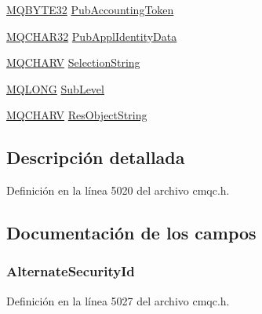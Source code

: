\begin{DoxyCompactItemize}
\item 
\hyperlink{cmqc_8h_aaa021c16e95b8aaab0a28fa5c3756d9d}{M\+Q\+B\+Y\+T\+E32} \hyperlink{structtag_m_q_s_d_af93c638cce691abfce1562bb498b1c38}{Pub\+Accounting\+Token}
\item 
\hyperlink{cmqc_8h_a0b7dd696f0148465fe80f6eae57b38a2}{M\+Q\+C\+H\+A\+R32} \hyperlink{structtag_m_q_s_d_aeae4d639ab8ac667cc227e3c6463cc74}{Pub\+Appl\+Identity\+Data}
\item 
\hyperlink{cmqc_8h_a2a61029e155515c1360dfc809dab6747}{M\+Q\+C\+H\+A\+R\+V} \hyperlink{structtag_m_q_s_d_ab3a91014a229bd897c17cbd04563bca2}{Selection\+String}
\item 
\hyperlink{cmqc_8h_a1fb8d28cbda3fa8766a9821230cdb6d5}{M\+Q\+L\+O\+N\+G} \hyperlink{structtag_m_q_s_d_a380ddfc450dd5ceb714a3d818f82c79b}{Sub\+Level}
\item 
\hyperlink{cmqc_8h_a2a61029e155515c1360dfc809dab6747}{M\+Q\+C\+H\+A\+R\+V} \hyperlink{structtag_m_q_s_d_a8f35fe6f52369753de1259a9468437eb}{Res\+Object\+String}
\end{DoxyCompactItemize}


\subsection{Descripción detallada}


Definición en la línea 5020 del archivo cmqc.\+h.



\subsection{Documentación de los campos}
\hypertarget{structtag_m_q_s_d_adc1f3b4aa3c6e3f3187e75291146cae7}{}
\subsubsection[{Alternate\+Security\+Id}]{ Alternate\+Security\+Id}\label{structtag_m_q_s_d_adc1f3b4aa3c6e3f3187e75291146cae7}


Definición en la línea 5027 del archivo cmqc.\+h.

\hypertarget{structtag_m_q_s_d_aa4de0947b84fe1c303c8a5a419ef024a}{}

